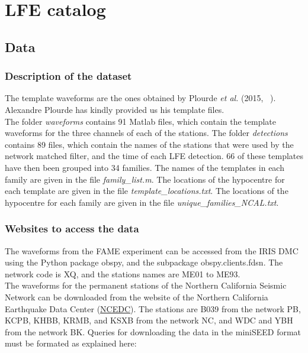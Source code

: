 \documentclass[main.tex]{subfiles}
\begin{document}
\part{LFE catalog}

\chapter{Data}

\section{Description of the dataset}

The template waveforms are the ones obtained by Plourde \textit{et al.} (2015, ~\cite{PLO_2015}). Alexandre Plourde has kindly provided us his template files. \\

The folder \textit{waveforms} contains 91 Matlab files, which contain the template waveforms for the three channels of each of the stations. The folder \textit{detections} contains 89 files, which contain the names of the stations that were used by the network matched filter, and the time of each LFE detection. 66 of these templates have then been grouped into 34 families. The names of the templates in each family are given in the file \textit{family\_list.m}. The locations of the hypocentre for each template are given in the file \textit{template\_locations.txt}. The locations of the hypocentre for each family are given in the file \textit{unique\_families\_NCAL.txt}.

\section{Websites to access the data}

The waveforms from the FAME experiment can be accessed from the IRIS DMC using the Python package obspy, and the subpackage obspy.clients.fdsn. The network code is XQ, and the stations names are ME01 to ME93. \\

The waveforms for the permanent stations of the Northern California Seismic Network can be downloaded from the website of the Northern California Earthquake Data Center (\href{http://ncedc.org/}{NCEDC}). The stations are B039 from the network PB, KCPB, KHBB, KRMB, and KSXB from the network NC, and WDC and YBH from the network BK. Queries for downloading the data in the miniSEED format must be formated as explained here: \\
\end{document}
